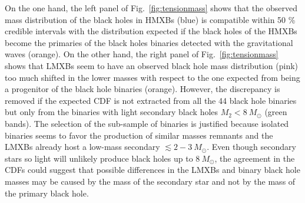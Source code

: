\documentclass[a4paper,titlepage]{book}     	%
\newcommand{\sun}{\ensuremath{_\odot}}
\newcommand{\msun}{\ensuremath{M\sun}}
\begin{document}
On the one hand, the left panel of Fig.\ \ref{fig:tensionmass} shows that the observed mass distribution of the black holes in HMXBs (blue) is compatible within 50 \% credible intervals with the distribution expected if the black holes of the HMXBs become the primaries of the black holes binaries detected with the gravitational waves (orange). On the other hand, the right panel of Fig.\ \ref{fig:tensionmass} shows that LMXBs seem to have an observed black hole mass distribution (pink) too much shifted in the lower masses with respect to the one expected from being a progenitor of the black hole binaries (orange). However, the discrepancy is removed if the expected CDF is not extracted from all the 44 black hole binaries but only from the binaries with light secondary black holes $M_2 < 8~\msun$ (green bands). The selection of the sub-sample of binaries is justified because isolated binaries seems to favor the production of similar masses remnants and the LMXBs already host a low-mass secondary $\lesssim 2-3~\msun$. Even though secondary stars so light will unlikely produce black holes up to $8~\msun$, the agreement in the CDFs could suggest that possible differences in the LMXBs and binary black hole masses may be caused by the mass of the secondary star and not by the mass of the primary black hole. \cite{HMXBH_spins2021}
\end{document}
